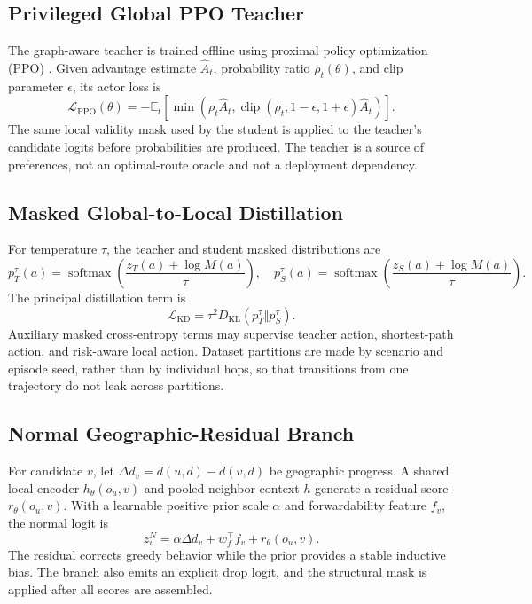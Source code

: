 \documentclass[drones,article,submit,moreauthors]{Definitions/mdpi}
\newcommand{\E}{\mathbb{E}}
\begin{document}
\subsection{Privileged Global PPO Teacher}

The graph-aware teacher is trained offline using proximal policy optimization (PPO) \cite{schulman2017ppo}. Given advantage estimate $\hat A_t$, probability ratio $\rho_t(\theta)$, and clip parameter $\epsilon$, its actor loss is
\begin{equation}
\mathcal{L}_{\mathrm{PPO}}(\theta)=-\E_t\!\left[\min\left(\rho_t\hat A_t,\operatorname{clip}(\rho_t,1-\epsilon,1+\epsilon)\hat A_t\right)\right].
\end{equation}
The same local validity mask used by the student is applied to the teacher's candidate logits before probabilities are produced. The teacher is a source of preferences, not an optimal-route oracle and not a deployment dependency.

\subsection{Masked Global-to-Local Distillation}

For temperature $\tau$, the teacher and student masked distributions are
\begin{equation}
p_T^\tau(a)=\operatorname{softmax}\!\left(\frac{z_T(a)+\log M(a)}{\tau}\right),\quad
p_S^\tau(a)=\operatorname{softmax}\!\left(\frac{z_S(a)+\log M(a)}{\tau}\right).
\end{equation}
The principal distillation term is \cite{hinton2015distilling}
\begin{equation}
\mathcal{L}_{\mathrm{KD}}=\tau^2D_{\mathrm{KL}}(p_T^\tau\Vert p_S^\tau).
\end{equation}
Auxiliary masked cross-entropy terms may supervise teacher action, shortest-path action, and risk-aware local action. Dataset partitions are made by scenario and episode seed, rather than by individual hops, so that transitions from one trajectory do not leak across partitions.

\subsection{Normal Geographic-Residual Branch}

For candidate $v$, let $\Delta d_v=d(u,d)-d(v,d)$ be geographic progress. A shared local encoder $h_\theta(o_u,v)$ and pooled neighbor context $\bar h$ generate a residual score $r_\theta(o_u,v)$. With a learnable positive prior scale $\alpha$ and forwardability feature $f_v$, the normal logit is
\begin{equation}
z^N_v=\alpha\Delta d_v+w_f^\top f_v+r_\theta(o_u,v).
\end{equation}
The residual corrects greedy behavior while the prior provides a stable inductive bias. The branch also emits an explicit drop logit, and the structural mask is applied after all scores are assembled.
\end{document}
